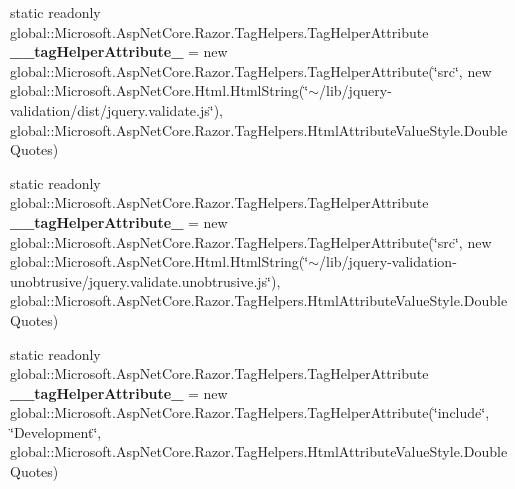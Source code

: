\begin{DoxyCompactItemize}
\item 
\mbox{\label{class_asp_net_core_1_1_views___shared_____validation_scripts_partial_ac89f55e2c2d97b6610037bdc546ebaa4}} 
static readonly global\+::\+Microsoft.\+Asp\+Net\+Core.\+Razor.\+Tag\+Helpers.\+Tag\+Helper\+Attribute {\bfseries \+\_\+\+\_\+tag\+Helper\+Attribute\+\_} = new global\+::\+Microsoft.\+Asp\+Net\+Core.\+Razor.\+Tag\+Helpers.\+Tag\+Helper\+Attribute(\char`\"{}src\char`\"{}, new global\+::\+Microsoft.\+Asp\+Net\+Core.\+Html.\+Html\+String(\char`\"{}$\sim$/lib/jquery-\/validation/dist/jquery.\+validate.\+js\char`\"{}), global\+::\+Microsoft.\+Asp\+Net\+Core.\+Razor.\+Tag\+Helpers.\+Html\+Attribute\+Value\+Style.\+Double\+Quotes)
\item 
\mbox{\label{class_asp_net_core_1_1_views___shared_____validation_scripts_partial_aa0950cde4f225e45898f0be37757d920}} 
static readonly global\+::\+Microsoft.\+Asp\+Net\+Core.\+Razor.\+Tag\+Helpers.\+Tag\+Helper\+Attribute {\bfseries \+\_\+\+\_\+tag\+Helper\+Attribute\+\_} = new global\+::\+Microsoft.\+Asp\+Net\+Core.\+Razor.\+Tag\+Helpers.\+Tag\+Helper\+Attribute(\char`\"{}src\char`\"{}, new global\+::\+Microsoft.\+Asp\+Net\+Core.\+Html.\+Html\+String(\char`\"{}$\sim$/lib/jquery-\/validation-\/unobtrusive/jquery.\+validate.\+unobtrusive.\+js\char`\"{}), global\+::\+Microsoft.\+Asp\+Net\+Core.\+Razor.\+Tag\+Helpers.\+Html\+Attribute\+Value\+Style.\+Double\+Quotes)
\item 
\mbox{\label{class_asp_net_core_1_1_views___shared_____validation_scripts_partial_a5e09c2a7d6f454d966f2da1677281ed8}} 
static readonly global\+::\+Microsoft.\+Asp\+Net\+Core.\+Razor.\+Tag\+Helpers.\+Tag\+Helper\+Attribute {\bfseries \+\_\+\+\_\+tag\+Helper\+Attribute\+\_} = new global\+::\+Microsoft.\+Asp\+Net\+Core.\+Razor.\+Tag\+Helpers.\+Tag\+Helper\+Attribute(\char`\"{}include\char`\"{}, \char`\"{}Development\char`\"{}, global\+::\+Microsoft.\+Asp\+Net\+Core.\+Razor.\+Tag\+Helpers.\+Html\+Attribute\+Value\+Style.\+Double\+Quotes)
\item 
\mbox{\label{class_asp_net_core_1_1_views___shared_____validation_scripts_partial_a0e382d3c2d5b4b4e8970b0753d301b0d}} 

\end{DoxyCompactItemize}
